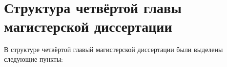 \documentclass[a4paper, 14pt]{extreport}
\begin{document}
    \chapter{Структура четвёртой главы магистерской диссертации}
    В структуре четвёртой главый магистерской диссертации были выделены следующие пункты:

    \newpage

\end{document}
